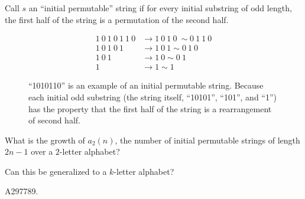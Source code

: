 \documentclass{article}
\begin{document}
  Call $s$ an ``initial permutable'' string if for every initial substring of
  odd length, the first half of the string is a permutation of the second half.
\begin{figure}[!h]
  \centering
  \begin{align*}
    1\ 0\ 1\ 0\ 1\ 1\ 0 &\rightarrow 1\ 0\ 1\ 0\ \sim 0\ 1\ 1\ 0\\
    1\ 0\ 1\ 0\ 1 &\rightarrow 1\ 0\ 1 \sim 0\ 1\ 0\\
    1\ 0\ 1 &\rightarrow 1\ 0 \sim 0\ 1\\
    1 &\rightarrow 1 \sim 1
  \end{align*}
  \caption{
    ``1010110'' is an example of an initial permutable string. Because each
    initial odd substring (the string itself, ``10101'', ``101'', and ``1'')
    has the property that the first half of the string is a rearrangement of
    second half.
  }
\end{figure}

\begin{question}
  What is the growth of $a_2(n)$, the number of initial permutable strings of
  length $2n - 1$ over a $2$-letter alphabet?
\end{question}
\begin{related}
  \item Can this be generalized to a $k$-letter alphabet?
\end{related}
\begin{references}
  \item A297789.
\end{references}
\end{document}
